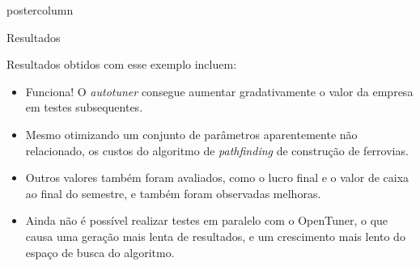 \documentclass[final]{beamer}
\begin{document}
\begin{frame}
\begin{columns}
\begin{column}{.5\textwidth}
\begin{beamercolorbox}[center,wd=\textwidth]{postercolumn}
\begin{minipage}[T]{.95\textwidth}
{\begin{block}{Resultados}
                \vspace*{0.4cm}
                
                Resultados obtidos com esse exemplo incluem:
                \begin{itemize}
                  \item Funciona! O \textit{autotuner} consegue aumentar gradativamente o valor da empresa em testes subsequentes.
                  \item Mesmo otimizando um conjunto de parâmetros aparentemente não relacionado, os custos do algoritmo de \textit{pathfinding} de construção de ferrovias.
                  \item Outros valores também foram avaliados, como o lucro final e o valor de caixa ao final do semestre, e também foram observadas melhoras.
                  \item Ainda não é possível realizar testes em paralelo com o OpenTuner, o que causa uma geração mais lenta de resultados, e um crescimento mais lento do espaço de busca do algoritmo.
                \end{itemize}
                
                \vspace*{0.2cm}
            \end{block}
            
%                
%                 
%                
%                
            
            \vspace*{0.2cm} 
            
}
\end{minipage}
\end{beamercolorbox}
\end{column}
\end{columns}
\end{frame}
\end{document}
